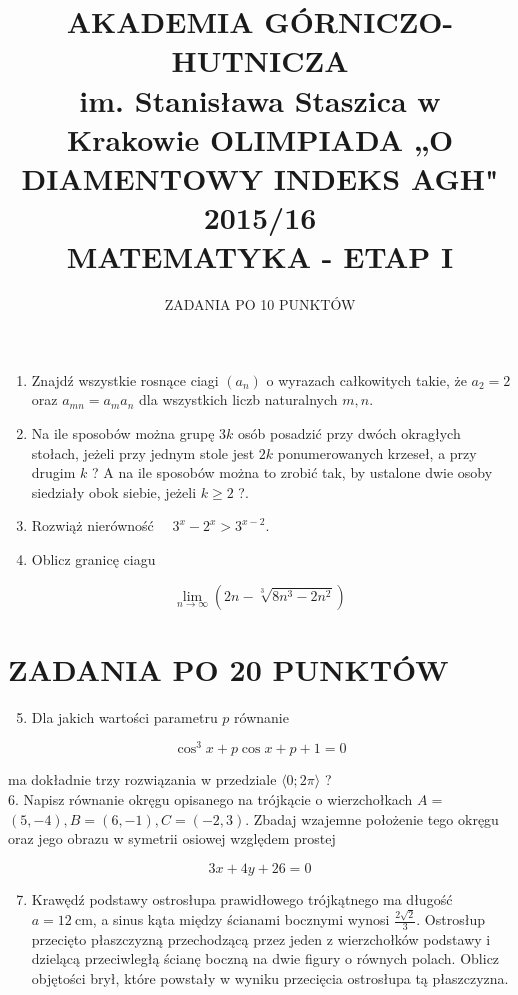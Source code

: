 \documentclass[10pt]{article}
\title{AKADEMIA GÓRNICZO-HUTNICZA \\
 im. Stanisława Staszica w Krakowie OLIMPIADA „O DIAMENTOWY INDEKS AGH" 2015/16 \\
 MATEMATYKA - ETAP I }
\author{ZADANIA PO 10 PUNKTÓW}
\date{}
\begin{document}
\maketitle


\begin{enumerate}
  \item Znajdź wszystkie rosnące ciagi $\left(a_{n}\right)$ o wyrazach całkowitych takie, że $a_{2}=2$ oraz $a_{m n}=a_{m} a_{n}$ dla wszystkich liczb naturalnych $m, n$.
  \item Na ile sposobów można grupę $3 k$ osób posadzić przy dwóch okragłych stołach, jeżeli przy jednym stole jest $2 k$ ponumerowanych krzeseł, a przy drugim $k$ ? A na ile sposobów można to zrobić tak, by ustalone dwie osoby siedziały obok siebie, jeżeli $k \geq 2$ ?.
  \item Rozwiąż nierówność $\quad 3^{x}-2^{x}>3^{x-2}$.
  \item Oblicz granicę ciagu
\end{enumerate}

$$
\lim _{n \rightarrow \infty}\left(2 n-\sqrt[3]{8 n^{3}-2 n^{2}}\right)
$$

\section*{ZADANIA PO 20 PUNKTÓW}
\begin{enumerate}
  \setcounter{enumi}{4}
  \item Dla jakich wartości parametru $p$ równanie
\end{enumerate}

$$
\cos ^{3} x+p \cos x+p+1=0
$$

ma dokładnie trzy rozwiązania w przedziale $\langle 0 ; 2 \pi\rangle$ ?\\
6. Napisz równanie okręgu opisanego na trójkącie o wierzchołkach $A=$ $(5,-4), B=(6,-1), C=(-2,3)$. Zbadaj wzajemne położenie tego okręgu oraz jego obrazu w symetrii osiowej względem prostej

$$
3 x+4 y+26=0
$$

\begin{enumerate}
  \setcounter{enumi}{6}
  \item Krawędź podstawy ostrosłupa prawidłowego trójkątnego ma długość $a=12 \mathrm{~cm}$, a sinus kąta między ścianami bocznymi wynosi $\frac{2 \sqrt{2}}{3}$. Ostrosłup przecięto płaszczyzną przechodzącą przez jeden z wierzchołków podstawy i dzielącą przeciwległą ścianę boczną na dwie figury o równych polach. Oblicz objętości brył, które powstały w wyniku przecięcia ostrosłupa tą płaszczyzna.
\end{enumerate}
\end{document}
